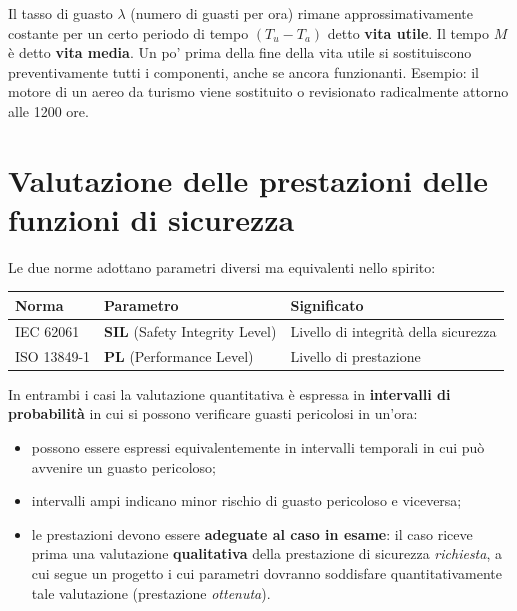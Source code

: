 \begin{note}
Il tasso di guasto $\lambda$ (numero di guasti per ora) rimane approssimativamente costante per un certo periodo di tempo $(T_u - T_a)$ detto \textbf{vita utile}. Il tempo $M$ è detto \textbf{vita media}. Un po' prima della fine della vita utile si sostituiscono preventivamente tutti i componenti, anche se ancora funzionanti. Esempio: il motore di un aereo da turismo viene sostituito o revisionato radicalmente attorno alle 1200 ore.
\end{note}

\section{Valutazione delle prestazioni delle funzioni di sicurezza}
Le due norme adottano parametri diversi ma equivalenti nello spirito:
\begin{center}
\begin{tabular}{lll}
\textbf{Norma} & \textbf{Parametro} & \textbf{Significato}\\
\hline
IEC 62061 & \textbf{SIL} (Safety Integrity Level) & Livello di integrità della sicurezza\\
ISO 13849-1 & \textbf{PL} (Performance Level) & Livello di prestazione\\
\end{tabular}
\end{center}

In entrambi i casi la valutazione quantitativa è espressa in \textbf{intervalli di probabilità} in cui si possono verificare guasti pericolosi in un'ora:
\begin{itemize}
    \item possono essere espressi equivalentemente in intervalli temporali in cui può avvenire un guasto pericoloso;
    \item intervalli ampi indicano minor rischio di guasto pericoloso e viceversa;
    \item le prestazioni devono essere \textbf{adeguate al caso in esame}: il caso riceve prima una valutazione \textbf{qualitativa} della prestazione di sicurezza \emph{richiesta}, a cui segue un progetto i cui parametri dovranno soddisfare quantitativamente tale valutazione (prestazione \emph{ottenuta}).
\end{itemize}

